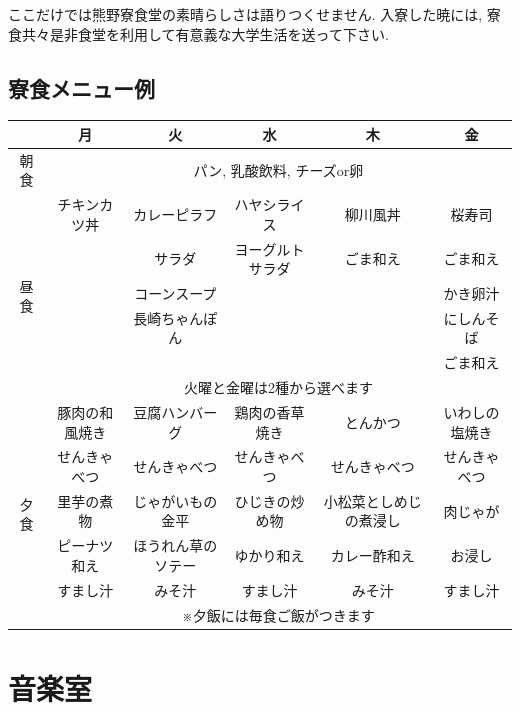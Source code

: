 \documentclass[10pt,b5jsbook,dvips,dvipdfmx,openany]{jsbook}
\theoremstyle{definition}
\begin{document}
		ここだけでは熊野寮食堂の素晴らしさは語りつくせません. 入寮した暁には, 寮食共々是非食堂を利用して有意義な大学生活を送って下さい.

		\subsection{寮食メニュー例}

\begin{table}[htb]
\begin{tabular}{|c|c|c|c|c|c|} \hline
&月&火&水&木&金 \\ \hline \hline
朝食& \multicolumn{5}{|c|}{パン, 乳酸飲料, チーズor卵} \\  \hline \hline
\multirow{6}{*}{昼食} & チキンカツ丼 &カレーピラフ & ハヤシライス & 柳川風丼 & 桜寿司 \\
&&サラダ	&ヨーグルトサラダ&ごま和え&ごま和え \\
&&コーンスープ&&&かき卵汁 \\  \cline{2-6}
&&長崎ちゃんぽん&&&にしんそば \\
&&&&&ごま和え \\  \cline{2-6}
&\multicolumn{5}{|c|}{火曜と金曜は2種から選べます} \\  \hline \hline
\multirow{6}{*}{夕食}&豚肉の和風焼き& 豆腐ハンバーグ& 鶏肉の香草焼き& とんかつ& いわしの塩焼き \\
&せんきゃべつ&せんきゃべつ&せんきゃべつ&せんきゃべつ& せんきゃべつ \\
&里芋の煮物& じゃがいもの金平& ひじきの炒め物	& 小松菜としめじの煮浸し& 肉じゃが \\
&ピーナツ和え& ほうれん草のソテー& ゆかり和え& カレー酢和え& お浸し\\
&すまし汁& みそ汁& すまし汁& みそ汁& すまし汁 \\ \cline{2-6}
&\multicolumn{5}{|c|}{※夕飯には毎食ご飯がつきます} \\ \hline
\end{tabular}
\end{table}


\newpage

	\section{音楽室} \label{sec:MUC}
\end{document}
